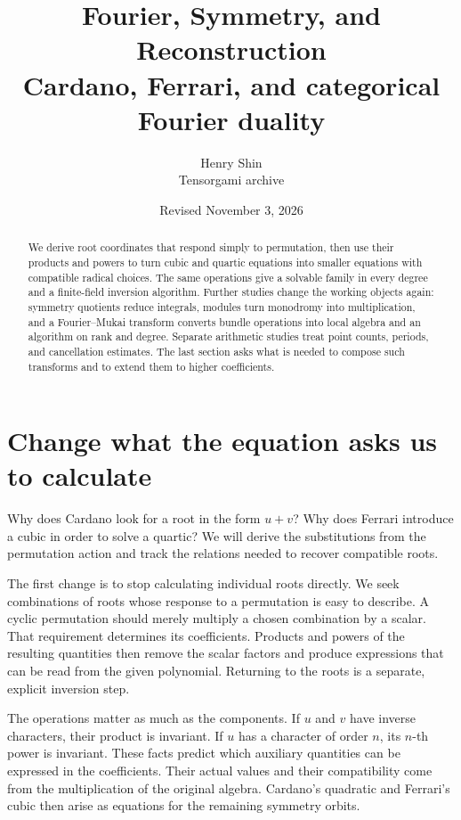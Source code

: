 \documentclass[11pt]{article}
\title{\textbf{Fourier, Symmetry, and Reconstruction}\\[6pt]\large Cardano, Ferrari, and categorical Fourier duality}
\author{Henry Shin\\\small Tensorgami archive}
\date{\small Revised November 3, 2026}
\theoremstyle{remark}
\begin{document}
\maketitle
\thispagestyle{empty}

\begin{abstract}
 We derive root coordinates that respond simply to permutation, then use their products and powers to turn cubic and quartic equations into smaller equations with compatible radical choices. The same operations give a solvable family in every degree and a finite-field inversion algorithm. Further studies change the working objects again: symmetry quotients reduce integrals, modules turn monodromy into multiplication, and a Fourier--Mukai transform converts bundle operations into local algebra and an algorithm on rank and degree. Separate arithmetic studies treat point counts, periods, and cancellation estimates. The last section asks what is needed to compose such transforms and to extend them to higher coefficients.
\end{abstract}

\clearpage
\begingroup
\setlength{\parskip}{0pt}
\fontsize{10}{12}\selectfont
\tableofcontents
\endgroup
\clearpage

\section{Change what the equation asks us to calculate}
\label{sec:reconstruction}

Why does Cardano look for a root in the form \(u+v\)? Why does Ferrari introduce a cubic in order to solve a quartic? We will derive the substitutions from the permutation action and track the relations needed to recover compatible roots.

The first change is to stop calculating individual roots directly. We seek combinations of roots whose response to a permutation is easy to describe. A cyclic permutation should merely multiply a chosen combination by a scalar. That requirement determines its coefficients. Products and powers of the resulting quantities then remove the scalar factors and produce expressions that can be read from the given polynomial. Returning to the roots is a separate, explicit inversion step.

The operations matter as much as the components. If \(u\) and \(v\) have inverse characters, their product is invariant. If \(u\) has a character of order \(n\), its \(n\)-th power is invariant. These facts predict which auxiliary quantities can be expressed in the coefficients. Their actual values and their compatibility come from the multiplication of the original algebra. Cardano's quadratic and Ferrari's cubic then arise as equations for the remaining symmetry orbits.
\end{document}
